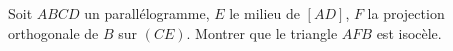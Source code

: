 Soit $ABCD$ un parallélogramme, $E$ le milieu de $[AD]$, $F$ la projection orthogonale de $B$ sur $(CE)$. Montrer que le triangle $AFB$ est isocèle.
